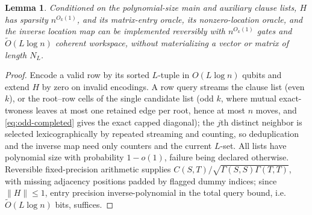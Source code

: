 \documentclass[11pt]{article}
\newtheorem{lemma}[lemma]{Lemma}
\theoremstyle{definition}
\theoremstyle{remark}
\newcommand{\1}{\mathbf 1}
\numberwithin{equation}{section}
\begin{document}
\begin{lemma}\label{lem:quantum-oracles}
Conditioned on the polynomial-size main and auxiliary clause lists, $H$
has sparsity $n^{O_k(1)}$, and its matrix-entry oracle, its
nonzero-location oracle, and the inverse location map can be
implemented reversibly with $n^{O_k(1)}$ gates and
$\widetilde O(L\log n)$ coherent workspace, without materializing a
vector or matrix of length $N_L$.
\end{lemma}
\begin{proof}
Encode a valid row by its sorted $L$-tuple in $O(L\log n)$ qubits and
extend $H$ by zero on invalid encodings.  A row query streams the
clause list (even $k$), or the root--row cells of the single candidate
list (odd $k$, where mutual exact-twoness leaves at most one retained
edge per root, hence at most $n$ moves, and \cref{eq:odd-completed}
gives the exact capped diagonal); the $j$th distinct neighbor is
selected lexicographically by repeated streaming and counting, so
deduplication and the inverse map need only counters and the current
$L$-set.  All lists have polynomial size with probability $1-o(1)$, failure
being declared otherwise.  Reversible fixed-precision arithmetic
supplies $C(S,T)/\sqrt{\Gamma(S,S)\Gamma(T,T)}$, with missing
adjacency positions padded by flagged dummy indices; since
$\|H\|\le1$, entry precision inverse-polynomial in the total query
bound, i.e.\ $\widetilde O(L\log n)$ bits, suffices.
\end{proof}
\end{document}
